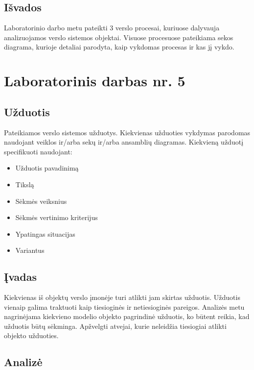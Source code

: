 \documentclass[10pt]{IEEEtran}
\begin{document}
        \subsection{Išvados}

            Laboratorinio darbo metu pateikti 3 verslo procesai, kuriuose dalyvauja analizuojamos verslo sistemos objektai. Visuose procesuose pateikiama sekos diagrama, kurioje detaliai parodyta, kaip vykdomas procesas ir kas jį vykdo.

    \section{Laboratorinis darbas nr. 5}

        \subsection{Užduotis}

            Pateikiamos verslo sistemos užduotys. Kiekvienas užduoties vykdymas parodomas naudojant veiklos ir/arba sekų ir/arba ansamblių diagramas. Kiekvieną užduotį specifikuoti naudojant:

            \begin{itemize}
                \item Užduotis pavadinimą
                \item Tikslą
                \item Sėkmės veiksnius
                \item Sėkmės vertinimo kriterijus
                \item Ypatingas situacijas
                \item Variantus
            \end{itemize}

        \subsection{Įvadas}

            Kiekvienas iš objektų verslo įmonėje turi atlikti jam skirtas užduotis. Užduotis vienaip galima traktuoti kaip tiesioginės ir netiesioginės pareigos. Analizės metu nagrinėjama kiekvieno modelio objekto pagrindinė užduotis, ko būtent reikia, kad užduotis būtų sėkminga. Apžvelgti atvejai, kurie neleidžia tiesiogiai atlikti objekto užduoties.

        \subsection{Analizė}
\end{document}
